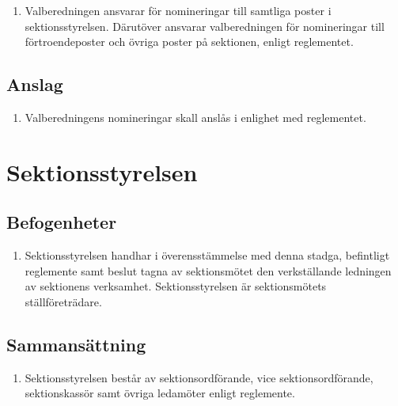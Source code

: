 \documentclass[11pt,a4paper]{article}
\begin{document}
\begin{enumerate}[\thesubsection.1]

  \item Valberedningen ansvarar för nomineringar till samtliga poster
  i sektionsstyrelsen. Därutöver ansvarar valberedningen för
  nomineringar till förtroendeposter och övriga poster på sektionen, enligt
  reglementet.

\end{enumerate}

\subsection{Anslag}

\begin{enumerate}[\thesubsection.1]

  \item Valberedningens nomineringar skall anslås i enlighet med reglementet.

\end{enumerate}


\newpage





\section{Sektionsstyrelsen}\label{sektionsstyrelsen}
\subsection{Befogenheter}

\begin{enumerate}[\thesubsection.1]

  \item Sektionsstyrelsen handhar i överens\-stäm\-melse med denna stadga, befintligt reglemente samt beslut tagna av sektionsmötet den verk\-ställ\-ande ledningen av sektionens verksamhet. Sektionsstyrelsen är sektions\-mötets ställ\-före\-trädare.

\end{enumerate}

\subsection{Sammansättning}

\begin{enumerate}[\thesubsection.1]

  \item Sektionsstyrelsen består av sektionsordförande, vice sektionsordförande, sektionskassör samt övriga ledamöter enligt reglemente.
\end{enumerate}
\end{document}
